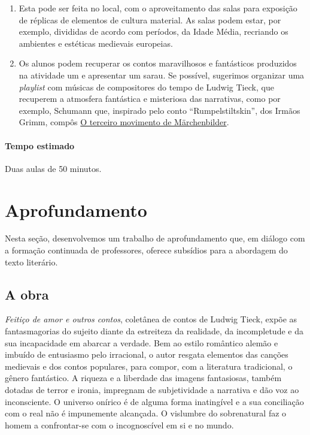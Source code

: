 \documentclass[12pt]{extarticle}
\begin{document}
\begin{enumerate}



\item
Esta pode ser feita no local, com o aproveitamento das salas para exposição 
de réplicas de elementos de cultura material. As salas podem estar, por exemplo, 
divididas de acordo com períodos, da Idade Média, recriando os ambientes e estéticas 
medievais europeias.

\item
Os alunos podem recuperar os contos maravilhosos e fantásticos produzidos na atividade um e 
apresentar um sarau. 
Se possível, sugerimos organizar uma \textit{playlist} com músicas de compositores do tempo de Ludwig Tieck, que
recuperem a atmosfera fantástica e misteriosa das narrativas, como por exemplo, Schumann que, inspirado 
pelo conto ``Rumpelstiltskin'', dos Irmãos Grimm, compôs \href{https://www.youtube.com/watch?v=zaX0IjTMChI&ab_channel=PacoM}{O terceiro movimento de Märchenbilder}.

\end{enumerate}

\paragraph{Tempo estimado} Duas aulas de 50 minutos. 


\section{Aprofundamento}

Nesta seção, desenvolvemos um trabalho de aprofundamento que, em diálogo
com a formação continuada de professores, oferece subsídios para a
abordagem do texto literário.

\subsection{A obra}

\emph{Feitiço de amor e outros contos}, coletânea de contos de Ludwig Tieck,
expõe as fantasmagorias do sujeito diante da estreiteza da realidade, da
incompletude e da sua incapacidade em abarcar a verdade. Bem ao estilo
romântico alemão e imbuído de entusiasmo pelo irracional, o autor
resgata elementos das canções medievais e dos contos populares, para
compor, com a literatura tradicional, o gênero fantástico. A riqueza e a
liberdade das imagens fantasiosas, também dotadas de terror e ironia,
impregnam de subjetividade a narrativa e dão voz ao inconsciente. O
universo onírico é de alguma forma inatingível e a sua conciliação com o
real não é impunemente alcançada. O vislumbre do sobrenatural faz o
homem a confrontar-se com o incognoscível em si e no mundo.
\end{document}
